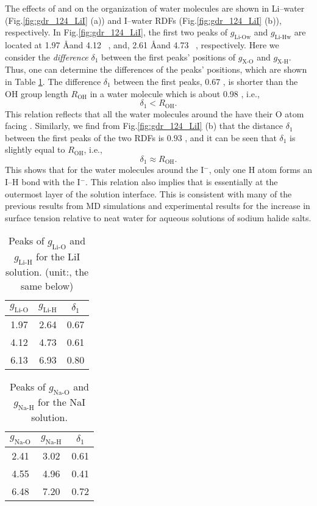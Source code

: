 The effects of \Li and \I on the organization of water molecules are shown in Li--water (Fig.\thinspace\ref{fig:gdr_124_LiI} (a)) 
and I--water RDFs (Fig.\thinspace\ref{fig:gdr_124_LiI} (b)), respectively.  
In Fig.\thinspace\ref{fig:gdr_124_LiI}, the first two peaks of $g_{\text{Li-Ow}}$ and $g_{\text{Li-Hw}}$ are located at 1.97 \AA and 4.12 \ \A,  
and, 2.61 \AA and 4.73 \ \A, respectively. 
Here we consider the \emph{difference} $\delta_1$ between the first peaks' positions of $g_{\text{X-O}}$ and $g_{\text{X-H}}$. 
Thus, one can determine the differences of the peaks' positions, which are shown in Table \ref{tab:gdr_Li-water}. 
The difference $\delta_1$ between the first peaks, 0.67 \A, is shorter than the OH group length $R_{\text{OH}}$ in a water molecule which is about 0.98 \A, i.e.,
\begin{equation}
\delta_1 < R_{\text{OH}}.
\label{lt_OH}
\end{equation}
This relation reflects that all the water molecules around the \Li have their O atom facing \li. 
Similarly, we find from Fig.\thinspace\ref{fig:gdr_124_LiI} (b) that the distance $\delta_1$ between the first peaks of the 
two RDFs is $0.93$ \A, and it can be seen that $\delta_1$ is slightly equal to $R_{\text{OH}}$, i.e., 
\begin{equation}
\delta_1 \approx R_{\text{OH}}.
\label{almost_OH}
\end{equation}
This shows that for the water molecules around the I$^-$, only one H atom forms an I--H bond with the I$^-$. 
This relation also implies that \I is essentially at the outermost layer of the solution interface. 
This is consistent with many of the previous results from MD simulations \cite{Dang2002,Jungwirth2001} 
and experimental results for the increase in surface tension relative to neat water for aqueous solutions of sodium halide salts.\cite{Jungwirth2002,Vrbka2004,Garrett2004,Bajaj2016}
\begin{table}[htbp] %
\centering
\caption{\label{tab:gdr_Li-water} 
Peaks of $g_{\text{Li-O}}$ and $g_{\text{Li-H}}$ for the LiI solution. (unit:\A, the same below)}
\begin{tabular}{ccc} %
  $g_{\text{Li-O}}$& $g_{\text{Li-H}}$ & $\delta_1$  \\
\hline
 1.97 & 2.64 & 0.67 \\
 4.12&4.73  &0.61  \\
 6.13 &6.93 & 0.80 
\end{tabular}
\end{table}
\begin{table}[htbp] %
  \centering
  \caption{\label{tab:gdr_Na-water} 
  Peaks of $g_{\text{Na-O}}$ and $g_{\text{Na-H}}$ for the NaI solution.}
  \begin{tabular}{ccc} %
    $g_{\text{Na-O}}$& $g_{\text{Na-H}}$ & $\delta_1$  \\
  \hline
   2.41 & 3.02 & 0.61 \\
   4.55 & 4.96  &0.41  \\
   6.48 & 7.20 & 0.72 
  \end{tabular}
\end{table}
